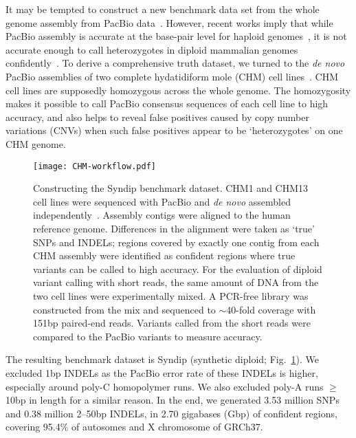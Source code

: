 \documentclass{bioinfo}
\begin{document}
It may be tempted to construct a new benchmark data set from the whole genome
assembly from PacBio data~\citep{Chin:2016aa}. However, recent works imply that while PacBio
assembly is accurate at the base-pair level for haploid
genomes~\citep{Chin:2013qr}, it is not accurate enough to call heterozygotes in
diploid mammalian genomes confidently~\citep{Gordon:2016kq,Seo:2016aa}.  To derive a
comprehensive truth dataset, we turned to the \emph{de novo} PacBio
assemblies of two complete hydatidiform mole (CHM) cell
lines~\citep{Schneider:2017aa,Huddleston:2017aa}. CHM cell lines are supposedly homozygous across
the whole genome. The homozygosity makes it possible to call PacBio consensus
sequences of each cell line to high accuracy, and also helps to reveal false
positives caused by copy number variations (CNVs) when such false positives
appear to be `heterozygotes' on one CHM genome.

\begin{figure}[!tb]

\texttt{[image: CHM-workflow.pdf]}
\caption{Constructing the Syndip benchmark dataset. CHM1 and CHM13 cell lines
were sequenced with PacBio and \emph{de novo} assembled
independently~\citep{Schneider:2017aa}. Assembly contigs were aligned to the
human reference genome. Differences in the alignment were taken as `true' SNPs
and INDELs; regions covered by exactly one contig from each CHM assembly were
identified as confident regions where true variants can be called to high
accuracy. For the evaluation of diploid variant calling with short reads, the
same amount of DNA from the two cell lines were experimentally mixed. A
PCR-free library was constructed from the mix and sequenced to $\sim$40-fold
coverage with 151bp paired-end reads.  Variants called from the short reads
were compared to the PacBio variants to measure accuracy.}\label{fig:flow}

\end{figure}

The resulting benchmark dataset is Syndip (synthetic diploid;
Fig.~\ref{fig:flow}). We excluded 1bp INDELs as the PacBio error rate of these
INDELs is higher, especially around poly-C homopolymer runs. We also excluded
poly-A runs $\ge$10bp in length for a similar reason. In the end, we generated
3.53 million SNPs and 0.38 million 2--50bp INDELs, in 2.70 gigabases (Gbp) of
confident regions, covering 95.4\% of autosomes and X chromosome of GRCh37.
\end{document}
